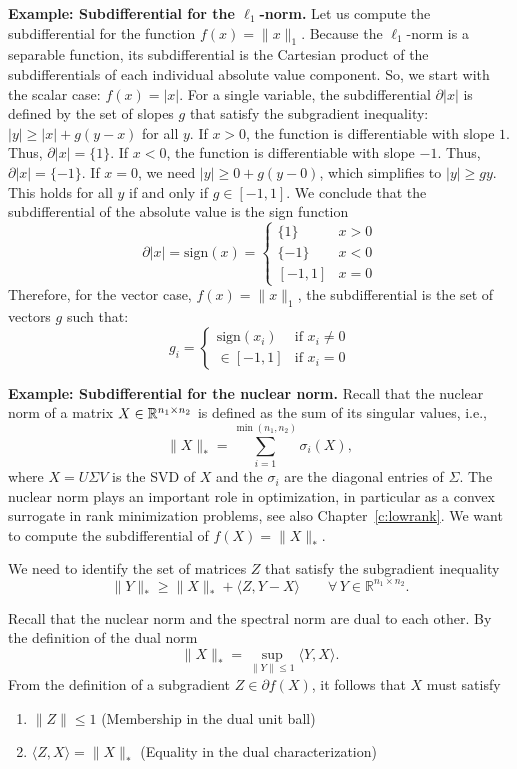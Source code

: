 \medskip
\noindent
\textbf{Example: Subdifferential for the $\ell_1$-norm.}
Let us compute the subdifferential for the function $f(x) = \|x\|_1$. Because the $\ell_1$-norm is a separable function, its subdifferential is the Cartesian product of the subdifferentials of each individual absolute value component. So, we start with the scalar case:  $f(x) = |x|$.
For a single variable, the subdifferential $\partial |x|$ is defined by the set of slopes $g$ that satisfy the subgradient inequality: $|y| \geq |x| + g(y - x)$ for all $y$.
If $x > 0$, the function is differentiable with slope $1$. Thus, $\partial |x| = \{1\}$.
If $x < 0$, the function is differentiable with slope $-1$. Thus, $\partial |x| = \{-1\}$.
If $x = 0$, we need $|y| \geq 0 + g(y - 0)$, which simplifies to $|y| \geq gy$. This holds for all $y$ if and only if $g \in [-1, 1]$.
We conclude that the subdifferential of the absolute value is the sign function
$$
\partial |x| = \text{sign}(x) = 
\begin{cases} \{1\} & x > 0 \\ \{-1\} & x < 0 \\ 
[-1, 1] & x = 0 \end{cases}
$$
Therefore, for the vector case, $f(x)=\|x\|_1$, the subdifferential is the set of vectors $g$ such that:
$$g_i = \begin{cases} \text{sign}(x_i) & \text{if } x_i \neq 0 \\ \in [-1, 1] & \text{if } x_i = 0 \end{cases}$$

\medskip
\noindent
\textbf{Example: Subdifferential for the nuclear norm.} 
Recall that the nuclear norm of a matrix $X\in \mathbb{R}^{n_1 \times n_2}$ is defined as the sum of its singular values, i.e.,
$$\|X\|_* = \sum_{i=1}^{\min(n_1,n_2)}\sigma_i(X),$$
where $X=U\Sigma V$ is the SVD of $X$ and the $\sigma_i$ are the diagonal entries of $\Sigma$.
The nuclear norm plays an important role in optimization, in particular as a convex surrogate in rank minimization problems, see also Chapter~\ref{c:lowrank}. We want to compute the subdifferential of $f(X) = \|X\|_*$.

We  need to identify the set of matrices $Z$ that satisfy the subgradient inequality
$$\|Y\|_* \geq \|X\|_* + \langle Z, Y - X \rangle \qquad \forall \, Y \in \mathbb{R}^{n_1 \times n_2}.$$


Recall that the nuclear norm and the spectral norm are dual to each other. By the definition of the dual norm
$$\|X\|_* = \sup_{\|Y\|\le 1} \langle Y, X \rangle.$$
From the definition of a subgradient $Z \in \partial f(X)$, it follows that $X$ must satisfy
\begin{enumerate}
\item $\|Z\| \leq 1$ \quad (Membership in the dual unit ball)
\item $\langle Z, X \rangle = \|X\|_*$ \quad (Equality in the dual characterization)
\end{enumerate}



